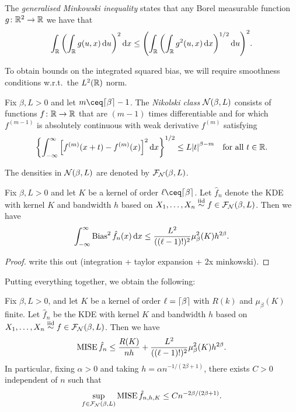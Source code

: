\begin{recap}
	The \emph{generalised Minkowski inequality} states that any Borel measurable function $g \colon \mathbb R^2 \to \mathbb R$ we have that
	\[
	\int_\mathbb R \qty(\int_\mathbb R g(u, x) \dd{u})^2 \dd{x} \leq \qty(\int_\mathbb R \qty(\int_\mathbb R g^2(u, x) \dd{x})^{1/2} \dd{u})^2. 
	\] 
\end{recap}
To obtain bounds on the integrated squared bias, we will require smoothness conditions w.r.t.\ the $L^2(\mathbb R)$ norm. 
\begin{definition}
	Fix $\beta, L > 0$ and let $m \ceq \ceil{\beta} - 1$. The \emph{Nikolski class} $\mathcal N(\beta, L)$ consists of functions $f \colon \mathbb R \to \mathbb R$ that are $(m-1)$ times differentiable and for  which $f^{(m-1)}$ is absolutely continuous with weak derivative $f^{(m)}$ satisfying
	\[
	\qty{\int_{-\infty}^\infty \qty[ f^{(m)}(x + t) - f^{(m)}(x)]^2 \dd{x}}^{1/2} \leq L \abs{t}^{\beta - m} \quad\text{for all $t \in \mathbb R$}. 
	\]
	
	The densities in $\mathcal N(\beta, L)$ are denoted by $\mathcal F_\mathcal N(\beta, L)$. 
\end{definition}

\begin{proposition}
	Fix $\beta, L> 0$ and let $K$ be a kernel of order $\ell \ceq \ceil\beta$. Let $\hat f_n$ denote the KDE with kernel $K$ and bandwidth $h$ based on $X_1, \dotsc, X_n \overset{\mathrm{iid}}{\sim} f \in \mathcal F_\mathcal N(\beta, L)$. Then we have
	\[
	\int_{-\infty}^\infty \operatorname{Bias}^2 \hat f_n(x) \dd{x} \leq \frac{L^2}{((\ell - 1)!)^2} \mu_\beta^2(K) h^{2\beta}. 
	\]
\end{proposition}

\begin{proof}
	\TODO write this out (integration + taylor expansion + 2x minkowski). 
\end{proof}

Putting everything together, we obtain the following:
\begin{theorem} \label{thm:mise_bound}
	Fix $\beta, L > 0$, and let $K$ be a kernel of order $\ell = \lceil\beta\rceil$ with $R(k)$ and $\mu_\beta(K)$ finite. Let $\hat f_n$ be the KDE with kernel $K$ and bandwidth $h$ based on $X_1, \dotsc, X_n \overset{\mathrm{iid}}{\sim} f \in \mathcal F_\mathcal N(\beta, L)$. Then we have
	\[
	\operatorname{MISE}\hat f_n \leq \frac{R(K)}{nh} + \frac{L^2}{((\ell - 1)!)^2} \mu_\beta^2(K) h^{2\beta}. 
	\]
	In particular, fixing $\alpha > 0$ and taking $h = \alpha n^{-1/(2\beta + 1)}$, there exists $C > 0$ independent of $n$ such that
	\[
	\sup_{f \in \mathcal F_\mathcal N(\beta, L)} \operatorname{MISE} \hat f_{n, h, K} \leq C n^{-2\beta/(2\beta + 1)}. 
	\]
\end{theorem}

